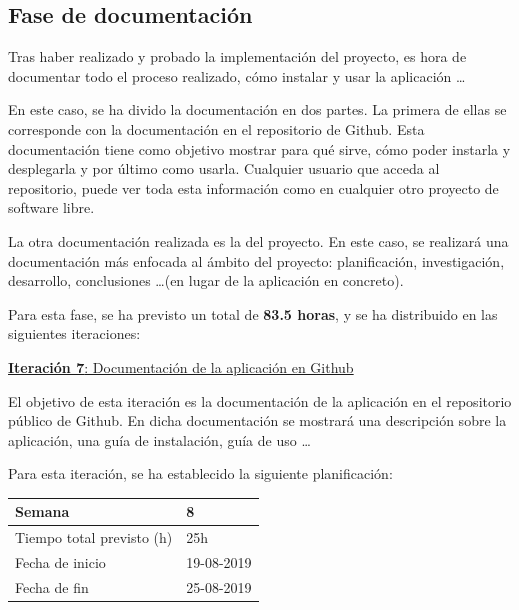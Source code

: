 \newpage

\subsection{Fase de documentación}

Tras haber realizado y probado la implementación del proyecto, es hora de documentar todo el proceso realizado, cómo instalar y usar la aplicación \ldots

En este caso, se ha divido la documentación en dos partes. La primera de ellas se corresponde con la documentación en el repositorio de Github. Esta documentación tiene como objetivo mostrar para qué sirve, cómo poder instarla y desplegarla y por último como usarla. Cualquier usuario que acceda al repositorio, puede ver toda esta información como en cualquier otro proyecto de software libre.

La otra documentación realizada es la del proyecto. En este caso, se realizará una documentación más enfocada al ámbito del proyecto: planificación, investigación, desarrollo, conclusiones \ldots (en lugar de la aplicación en concreto). 

Para esta fase, se ha previsto un total de \textbf{83.5 horas}, y se ha distribuido en las siguientes iteraciones:

\newpage


\large{\underline{\textbf{Iteración 7}: Documentación de la aplicación en Github}}
\vspace{0.3cm}

\normalsize

El objetivo de esta iteración es la documentación de la aplicación en el repositorio público de Github. En dicha documentación se mostrará una descripción sobre la aplicación, una guía de instalación, guía de uso \ldots

Para esta iteración, se ha establecido la siguiente planificación:

\begin{table}[h!]
\centering
\begin{tabular}{|p{5cm}|p{4cm}|}
 \hline
	\cellcolor[gray]{0.9} Semana  & 8\\ \hline
	\cellcolor[gray]{0.9} Tiempo total previsto (h)  & 25h \\ \hline
	\cellcolor[gray]{0.9} Fecha de inicio  & 19-08-2019 \\ \hline
	\cellcolor[gray]{0.9} Fecha de fin  & 25-08-2019 \\ \hline
		
\end{tabular}
\end{table}

